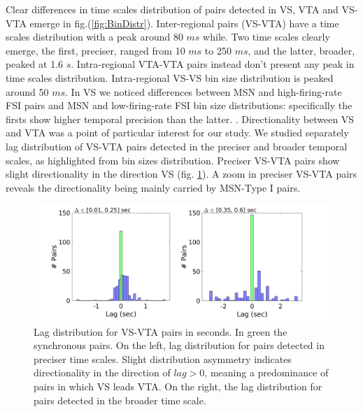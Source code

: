 Clear differences in time scales distribution of pairs detected in VS, VTA and VS-VTA emerge in fig.(\ref{fig:BinDistr}). Inter-regional pairs (VS-VTA) have a time scales distribution with a peak around 80 $ms$ while. Two time scales clearly emerge, the first, preciser, ranged from 10 $ms$ to 250 $ms$, and the latter, broader, peaked at 1.6 $s$. Intra-regional VTA-VTA pairs instead don't present any peak in time scales distribution. Intra-regional VS-VS bin size distribution is peaked around 50 $ms$. In VS we noticed differences between MSN and high-firing-rate FSI pairs and MSN and low-firing-rate FSI bin size distributions: specifically the firsts show higher temporal precision than the latter. {\color{red}{Include Figure of MSN-FSI and caption of bin size distribution}}.
Directionality between VS and VTA was a point of particular interest for our study. We studied separately lag distribution of VS-VTA pairs detected in the preciser and broader temporal scales, as highlighted from bin sizes distribution. Preciser VS-VTA pairs show slight directionality in the direction VS (fig. \ref{fig:LagInSecAll}). A zoom in preciser VS-VTA pairs reveals the directionality being mainly carried by MSN-Type I pairs.
\begin{figure}[H]
\centering
\includegraphics[scale=0.3]{figures/LagGeneralInSec.png}
\caption{Lag distribution for VS-VTA pairs in seconds. In green the synchronous pairs. On the left, lag distribution for pairs detected in preciser time scales. Slight distribution asymmetry indicates directionality in the direction of $lag > 0$, meaning a predominance of pairs in which VS leads VTA. On the right, the lag distribution for pairs detected in the broader time scale.}
\label{fig:LagInSecAll}
\end{figure}

